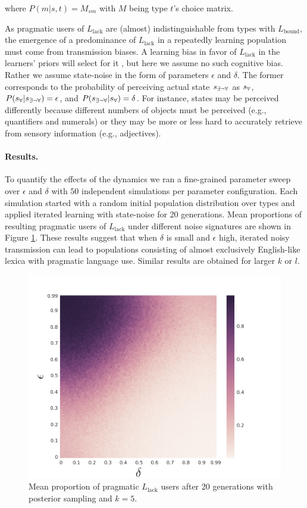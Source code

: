 \documentclass[10pt,a4paper]{article}
\newcommand{\state}{\ensuremath{s}\xspace}		%
\newcommand{\mystate}[1]{\ensuremath{\state_{\text{#1}}}\xspace} %
\newcommand{\ssome}{\mystate{\ensuremath{\exists\neg\forall}}}
\newcommand{\sall}{\mystate{\ensuremath{\forall}}}
\begin{document}
\noindent where $P(m|s,t) = M_{sm}$ with $M$ being type $t$'s choice matrix.

As pragmatic users of $L_\text{lack}$ are (almost) indistinguishable from types with
$L_\text{bound}$, the emergence of a predominance of $L_\text{lack}$ in a repeatedly learning
population must come from transmission biases. A learning bias in favor of $L_\text{lack}$ in
the learners' priors will select for it \citep{brochhagen+etal:2016:CogSci}, but here we assume
no such cognitive bias. Rather we assume state-noise in the form of parameters $\epsilon$ and
$\delta$. The former corresponds to the probability of perceiving actual state $\ssome$ as
$\sall$, $P(\sall | \ssome) = \epsilon$, and $P(\ssome | \sall) = \delta$. For instance, states
may be perceived differently because different numbers of objects must be perceived (e.g.,
quantifiers and numerals) or they may be more or less hard to accurately retrieve from sensory
information (e.g., adjectives).


\paragraph{Results.} To quantify the effects of the dynamics we ran a fine-grained parameter
sweep over $\epsilon$ and $\delta$ with $50$ independent simulations per parameter
configuration. Each simulation started with a random initial population distribution over types
and applied iterated learning with state-noise for 20 generations. Mean proportions of resulting
pragmatic users of $L_{\text{lack}}$ under different noise signatures are shown in Figure
\ref{fig:quant}. These results suggest that when $\delta$ is small and $\epsilon$ high, iterated noisy transmission can
lead to populations consisting of almost exclusively English-like lexica with pragmatic
language use. Similar results are obtained for larger $k$ or $l$.

\begin{figure}[ht]
\centering
    \includegraphics[scale=0.33]{../code/plots/quantifiers-posterior-sampling-k5.png}
  \caption{Mean proportion of pragmatic $L_{\text{lack}}$ users after $20$ generations with posterior sampling and $k = 5$.}
  \label{fig:quant}
\end{figure}
\end{document}
